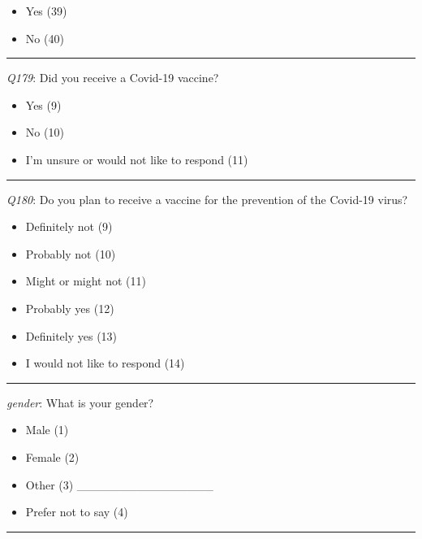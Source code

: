 \begin{itemize}
\tightlist
\item
  Yes (39)
\item
  No (40)
\end{itemize}

\begin{center}\rule{0.5\linewidth}{0.5pt}\end{center}

\emph{Q179}: Did you receive a Covid-19 vaccine?

\begin{itemize}
\tightlist
\item
  Yes (9)
\item
  No (10)
\item
  I'm unsure or would not like to respond (11)
\end{itemize}

\begin{center}\rule{0.5\linewidth}{0.5pt}\end{center}

\emph{Q180}: Do you plan to receive a vaccine for the prevention of the Covid-19 virus?

\begin{itemize}
\tightlist
\item
  Definitely not (9)
\item
  Probably not (10)
\item
  Might or might not (11)
\item
  Probably yes (12)
\item
  Definitely yes (13)
\item
  I would not like to respond (14)
\end{itemize}

\begin{center}\rule{0.5\linewidth}{0.5pt}\end{center}

\emph{gender}: What is your gender?

\begin{itemize}
\tightlist
\item
  Male (1)
\item
  Female (2)
\item
  Other (3) \_\_\_\_\_\_\_\_\_\_\_\_\_\_\_\_
\item
  Prefer not to say (4)
\end{itemize}

\begin{center}\rule{0.5\linewidth}{0.5pt}\end{center}

